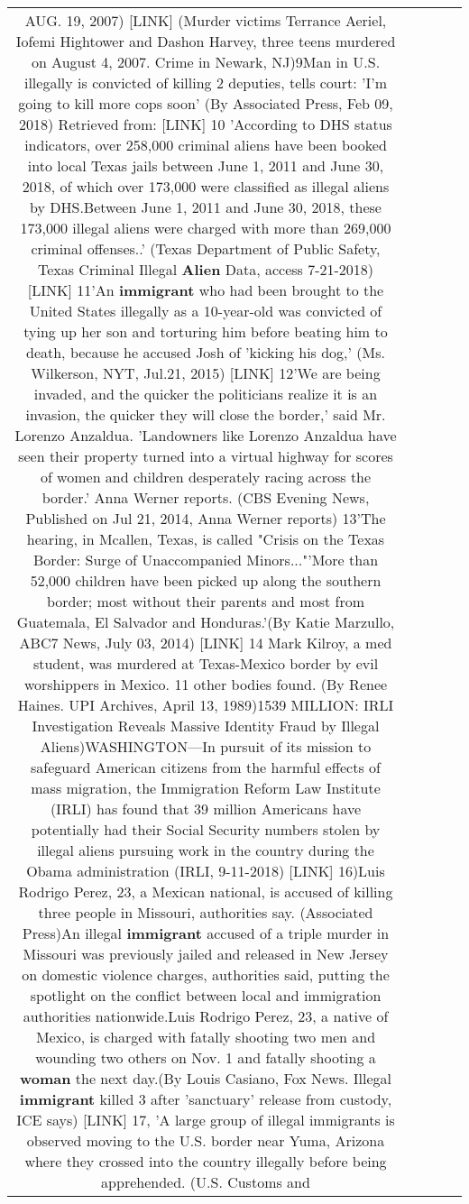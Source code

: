 \documentclass[11pt]{article}
\newlength\mylength
\begin{document}
\begin{center}
\begin{longtable}{|C{.65\mylength}|C{.30\mylength}|C{.12\mylength}|C{.12\mylength}|C{.12\mylength}|}
AUG. 19, 2007)  [LINK] (Murder victims Terrance Aeriel, Iofemi Hightower and Dashon Harvey, three teens murdered on August 4, 2007.  Crime in Newark, NJ)9Man in U.S. illegally is convicted of killing 2 deputies, tells court: 'I'm going to kill more cops soon' (By Associated Press, Feb 09, 2018) Retrieved from:  [LINK] 10 'According to DHS status indicators, over 258,000 criminal aliens have been booked into local Texas jails between June 1, 2011 and June 30, 2018, of which over 173,000 were classified as illegal aliens by DHS.Between June 1, 2011 and June 30, 2018, these 173,000 illegal aliens were charged with more than 269,000 criminal offenses..' (Texas Department of Public Safety, Texas Criminal Illegal \textbf{Alien} Data, access 7-21-2018)  [LINK] 11'An \textbf{immigrant} who had been brought to the United States illegally as a 10-year-old was convicted of tying up her son and torturing him before beating him to death, because he accused Josh of 'kicking his dog,' (Ms. Wilkerson, NYT, Jul.21, 2015) [LINK] 12'We are being invaded, and the quicker the politicians realize it is an invasion, the quicker they will close the border,' said Mr. Lorenzo Anzaldua. 'Landowners like Lorenzo Anzaldua have seen their property turned into a virtual highway for scores of women and children desperately racing across the border.' Anna Werner reports. (CBS Evening News, Published on Jul 21, 2014, Anna Werner reports) 13'The hearing, in Mcallen, Texas, is called "Crisis on the Texas Border: Surge of Unaccompanied Minors..."'More than 52,000 children have been picked up along the southern border; most without their parents and most from Guatemala, El Salvador and Honduras.'(By Katie Marzullo, ABC7 News, July 03, 2014)  [LINK] 14 Mark Kilroy, a med student, was murdered at Texas-Mexico border by evil worshippers in Mexico. 11 other bodies found. (By Renee Haines. UPI Archives, April 13, 1989)1539 MILLION: IRLI Investigation Reveals Massive Identity Fraud by Illegal Aliens)WASHINGTON—In pursuit of its mission to safeguard American citizens from the harmful effects of mass migration, the Immigration Reform Law Institute (IRLI) has found that 39 million Americans have potentially had their Social Security numbers stolen by illegal aliens pursuing work in the country during the Obama administration (IRLI, 9-11-2018) [LINK] 16)Luis Rodrigo Perez, 23, a Mexican national, is accused of killing three people in Missouri, authorities say. (Associated Press)An illegal \textbf{immigrant} accused of a triple murder in Missouri was previously jailed and released in New Jersey on domestic violence charges, authorities said, putting the spotlight on the conflict between local and immigration authorities nationwide.Luis Rodrigo Perez, 23, a native of Mexico, is charged with fatally shooting two men and wounding two others on Nov. 1 and fatally shooting a \textbf{woman} the next day.(By Louis Casiano,  Fox News.   Illegal \textbf{immigrant} killed 3 after 'sanctuary' release from custody, ICE says) [LINK] 17,  'A large group of illegal immigrants is observed moving to the U.S. border near Yuma, Arizona where they crossed into the country illegally before being apprehended. (U.S. Customs and 
\end{longtable}
\end{center}
\end{document}

